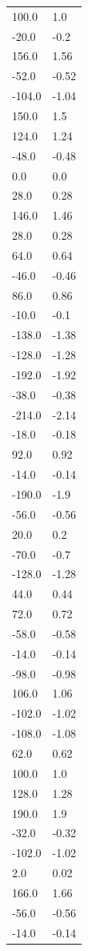 \begin{longtable}{ll}
100.0 & 1.0 \\
-20.0 & -0.2 \\
156.0 & 1.56 \\
-52.0 & -0.52 \\
-104.0 & -1.04 \\
150.0 & 1.5 \\
124.0 & 1.24 \\
-48.0 & -0.48 \\
0.0 & 0.0 \\
28.0 & 0.28 \\
146.0 & 1.46 \\
28.0 & 0.28 \\
64.0 & 0.64 \\
-46.0 & -0.46 \\
86.0 & 0.86 \\
-10.0 & -0.1 \\
-138.0 & -1.38 \\
-128.0 & -1.28 \\
-192.0 & -1.92 \\
-38.0 & -0.38 \\
-214.0 & -2.14 \\
-18.0 & -0.18 \\
92.0 & 0.92 \\
-14.0 & -0.14 \\
-190.0 & -1.9 \\
-56.0 & -0.56 \\
20.0 & 0.2 \\
-70.0 & -0.7 \\
-128.0 & -1.28 \\
44.0 & 0.44 \\
72.0 & 0.72 \\
-58.0 & -0.58 \\
-14.0 & -0.14 \\
-98.0 & -0.98 \\
106.0 & 1.06 \\
-102.0 & -1.02 \\
-108.0 & -1.08 \\
62.0 & 0.62 \\
100.0 & 1.0 \\
128.0 & 1.28 \\
190.0 & 1.9 \\
-32.0 & -0.32 \\
-102.0 & -1.02 \\
2.0 & 0.02 \\
166.0 & 1.66 \\
-56.0 & -0.56 \\
-14.0 & -0.14 \\

\end{longtable}
